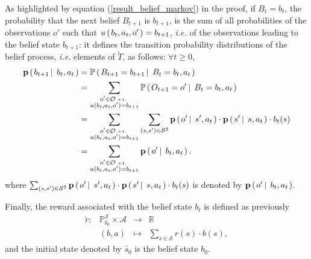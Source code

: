 As highlighted by equation (\ref{result_belief_markov}) in the proof, 
if $B_t=b_t$, the probability that the next belief $B_{t+1}$ is $b_{t+1}$, 
is the sum of all probabilities of the observations $o'$
such that $u \left( \left. b_t,a_t,o' \right. \right)=b_{t+1}$, \textit{i.e.}
of the observations leading to the belief state $b_{t+1}$: 
it defines the transition probability distributions of the belief process,
\textit{i.e.} elements of $\tilde{T}$, as follows: $\forall t \geqslant 0$,
\begin{align}
\nonumber \textbf{p} \left( \left.  b_{t+1} \, \right| \left. \, b_t,a_t \right. \right) &= \mathbb{P} \left( \left.  B_{t+1} = b_{t+1} \, \right| \left. \, B_t=b_t, a_t  \right. \right) \\
\nonumber &= \sum_{\substack{ o' \in \mathcal{O} \mbox{ \tiny s.t. } \\ u(b_t,a_{t},o') = b_{t+1}} } \mathbb{P} \left( \left.  O_{t+1} = o' \, \right| \left. \, B_t=b_t, a_t \right. \right) \\
\label{belief_transition} &= \sum_{ \substack{ o' \in \mathcal{O} \mbox{ \tiny s.t. } \\ u(b_t,a_t,o') = b_{t+1}} } \sum_{(s,s') \in \mathcal{S}^2}\textbf{p} \left( \left.  o' \, \right| \left. \, s', a_t  \right. \right) \cdot \textbf{p} \left( \left.  s' \, \right| \left. \, s, a_t  \right. \right) \cdot b_t(s)\\
\nonumber &= \sum_{ \substack{ o' \in \mathcal{O} \mbox{ \tiny s.t. } \\ u(b_t,a_t,o') = b_{t+1}} } \textbf{p} \left( \left.  o' \, \right| \left. \, b_t, a_t  \right. \right).
\end{align}
where $\sum_{(s,s') \in \mathcal{S}^2}\textbf{p} \left( \left.  o' \, \right| \left. \, s', a_t  \right. \right) \cdot \textbf{p} \left( \left.  s' \, \right| \left. \, s, a_t  \right. \right) \cdot b_t(s)$ is denoted by 
$\textbf{p} \left( \left.  o' \, \right| \left. \, b_t, a_t  \right. \right)$.

Finally, the reward associated with the belief state $b_t$ is defined as previously
\begin{equation}
\label{belief_reward} \begin{array}{ccccc} \tilde{r}: & \mathbb{P}^{\mathcal{S}}_{b_0}  \times \mathcal{A} & \rightarrow & \mathbb{R} \\ 
						& (b,a) & \mapsto & \sum_{s \in \mathcal{S}} r(s) \cdot b(s),
\end{array}
\end{equation} 
and the initial state denoted by $\tilde{s_0}$ is the belief state $b_0$.

